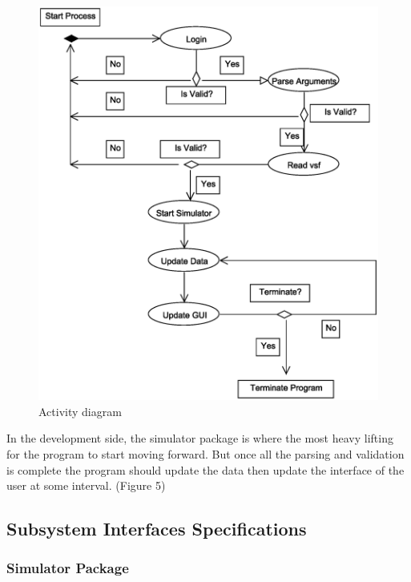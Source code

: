 \documentclass{article}
\begin{document}
\begin{figure}[h]	
\caption{Activity diagram}
\centering
\includegraphics[scale=0.3]{diagrams/activity-diagram.eps}
\end{figure}

\vspace{1cm}

In the development side, the simulator package is where the most heavy lifting for the program to start moving forward. 
But once all the parsing and validation is complete the program should update the data then update the interface of the user at some interval.
(Figure 5)

\break

\subsection{Subsystem Interfaces Specifications}

\subsubsection{Simulator Package}
\end{document}
